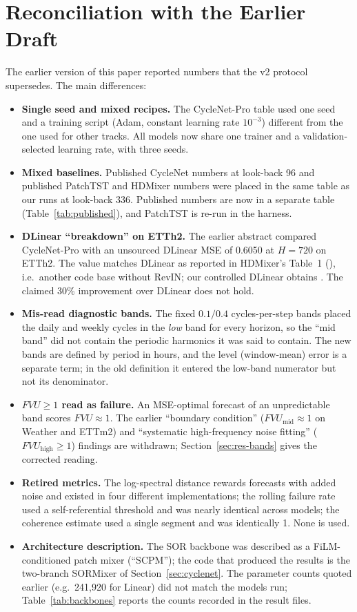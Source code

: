 \documentclass[11pt,a4paper]{article}
\begin{document}
\section{Reconciliation with the Earlier Draft}
\label{app:reconciliation}
The earlier version of this paper reported numbers that the v2 protocol supersedes. The main differences:
\begin{itemize}
    \item \textbf{Single seed and mixed recipes.} The CycleNet-Pro table used one seed and a training script (Adam, constant learning rate $10^{-3}$) different from the one used for other tracks. All models now share one trainer and a validation-selected learning rate, with three seeds.
    \item \textbf{Mixed baselines.} Published CycleNet numbers at look-back 96 and published PatchTST and HDMixer numbers were placed in the same table as our runs at look-back 336. Published numbers are now in a separate table (Table~\ref{tab:published}), and PatchTST is re-run in the harness.
    \item \textbf{DLinear ``breakdown'' on ETTh2.} The earlier abstract compared CycleNet-Pro with an unsourced DLinear MSE of 0.6050 at $H=720$ on ETTh2. The value matches DLinear as reported in HDMixer's Table~1 (\vPubDlinETThTwo), i.e.\ another code base without RevIN; our controlled DLinear obtains \vOurDlinETThTwo. The claimed 30\% improvement over DLinear does not hold.
    \item \textbf{Mis-read diagnostic bands.} The fixed $0.1/0.4$ cycles-per-step bands placed the daily and weekly cycles in the \emph{low} band for every horizon, so the ``mid band'' did not contain the periodic harmonics it was said to contain. The new bands are defined by period in hours, and the level (window-mean) error is a separate term; in the old definition it entered the low-band numerator but not its denominator.
    \item \textbf{$FVU\ge1$ read as failure.} An MSE-optimal forecast of an unpredictable band scores $FVU\approx1$. The earlier ``boundary condition'' ($FVU_{\text{mid}}\approx1$ on Weather and ETTm2) and ``systematic high-frequency noise fitting'' ($FVU_{\text{high}}\ge1$) findings are withdrawn; Section~\ref{sec:res-bands} gives the corrected reading.
    \item \textbf{Retired metrics.} The log-spectral distance rewards forecasts with added noise and existed in four different implementations; the rolling failure rate used a self-referential threshold and was nearly identical across models; the coherence estimate used a single segment and was identically 1. None is used.
    \item \textbf{Architecture description.} The SOR backbone was described as a FiLM-conditioned patch mixer (``SCPM''); the code that produced the results is the two-branch SORMixer of Section~\ref{sec:cyclenet}. The parameter counts quoted earlier (e.g.\ 241,920 for Linear) did not match the models run; Table~\ref{tab:backbones} reports the counts recorded in the result files.
\end{itemize}
\end{document}
